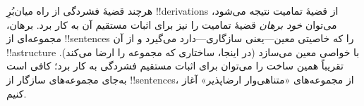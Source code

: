 \documentclass[../../../include/open-logic-section]{subfiles}
\begin{document}
هرچند قضیهٔ فشردگی از راه میان‌بُرِ !!{derivation}s از قضیهٔ تمامیت
نتیجه می‌شود، می‌توان \emph{خود برهان} قضیهٔ تمامیت را نیز برای اثبات
مستقیم آن به کار برد. برهان، مجموعه‌ای از !!{sentence}s را که خاصیتی
معین---یعنی سازگاری---دارد می‌گیرد و از آن !!a{structure} با خواصی معین
می‌سازد (در اینجا، ساختاری که مجموعه را ارضا می‌کند). تقریباً همین ساخت
را می‌توان برای اثبات مستقیم فشردگی به کار برد؛ کافی است به‌جای
مجموعه‌های سازگار از !!{sentence}s، از مجموعه‌های «متناهی‌وار ارضاپذیر»
آغاز کنیم.
\end{document}
